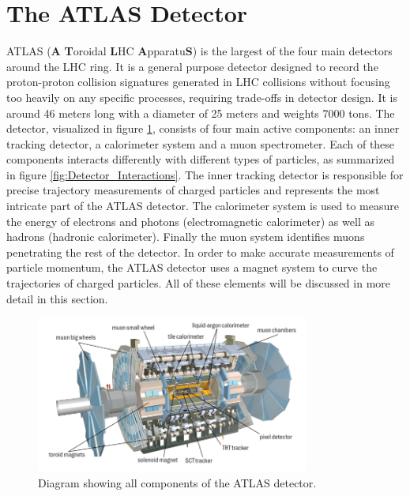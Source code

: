 \section{The ATLAS Detector}

ATLAS (\textbf{A} \textbf{T}oroidal \textbf{L}HC \textbf{A}pparatu\textbf{S}) is the largest of the four main detectors 
around the LHC ring. It is a general purpose detector designed to record the proton-proton collision signatures 
generated in LHC collisions without focusing too heavily on any specific processes, requiring trade-offs in detector 
design. It is around 46 meters long with a diameter of 25 meters and weights 7000 tons. The detector, visualized in 
figure \ref{fig:ATLAS_Detector}, consists of four main active components: an inner tracking detector, a calorimeter 
system and a muon spectrometer. Each of these components interacts differently with different types of particles, as 
summarized in figure \ref{fig:Detector_Interactions}. The inner tracking detector is responsible for precise trajectory 
measurements of charged particles and represents the most intricate part of the ATLAS detector. The calorimeter system 
is used to measure the energy of electrons and photons (electromagnetic calorimeter) as well as hadrons (hadronic 
calorimeter). Finally the muon system identifies muons penetrating the rest of the detector. In order to make accurate 
measurements of particle momentum, the ATLAS detector uses a magnet system to curve the trajectories of charged 
particles. All of these elements will be discussed in more detail in this section.

\begin{figure}[h!]
\centering
    \includegraphics[width=0.8\textwidth]{images/ATLAS_Detector.jpg}
    \caption{Diagram showing all components of the ATLAS detector.}
    \label{fig:ATLAS_Detector}
\end{figure}

